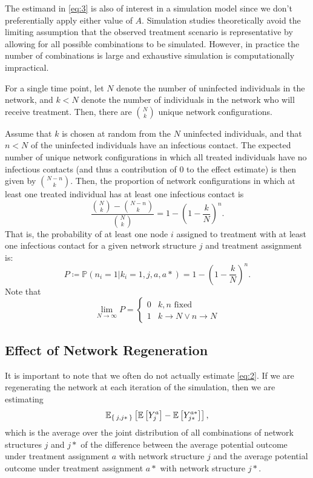 \documentclass{article}
\theoremstyle{definition}
\begin{document}
The estimand in \ref{eq:3} is also of interest in a simulation model since we don't preferentially apply either value of $A$. Simulation studies theoretically avoid the limiting assumption that the observed treatment scenario is representative by allowing for all possible combinations to be simulated. However, in practice the number of combinations is large and exhaustive simulation is computationally impractical.


For a single time point, let $N$ denote the number of uninfected individuals in the network, and $k <N$ denote the number of individuals in the network who will receive treatment. Then, there are $N \choose k$ unique network configurations.

Assume that $k$ is chosen at random from the $N$ uninfected individuals, and that $n<N$ of the uninfected individuals have an infectious contact. The expected number of unique network configurations  in which all treated individuals have no infectious contacts (and thus a contribution of 0 to the effect estimate) is then given by $N-n\choose k$. Then, the proportion of network configurations in which at least one treated individual has at least one infectious contact is 
\begin{equation}\label{eq:4}
    \frac{{N \choose k}-{N-n \choose k}}{{N \choose k}}=1-\left(1-\frac{k}{N}\right)^{n}.
\end{equation}
That is, the probability of at least one node $i$ assigned to treatment with at least one infectious contact for a given network structure $j$ and treatment assignment is:
\begin{equation}\label{eq:5}
    P \coloneqq \mathbb{P}\left(n_{i}=1 \vert k_{i}=1,j,a,a*\right)=1-\left(1-\frac{k}{N}\right)^{n}.
\end{equation}
Note that 
\begin{equation}\label{eq:6}
    \lim_{N \to \infty}P=\begin{cases}0 & k,n \text{ fixed} \\ 1 & k \to N \lor n \to N  \end{cases}
\end{equation}

\subsection{Effect of Network Regeneration}
It is important to note that we often do not actually estimate \ref{eq:2}. If we are regenerating the network at each iteration of the simulation, then we are estimating \begin{equation}\label{eq:8}
    \mathbb{E}_{\Set{j,j*}}\left[\mathbb{E}\left[Y_{j}^{a}\right]-\mathbb{E}\left[Y_{j*}^{a*}\right]\right],
\end{equation} 
which is the average over the joint distribution of all combinations of network structures $j$ and $j*$ of the difference between the average potential outcome under treatment assignment $a$ with network structure $j$ and the average potential outcome under  treatment assignment $a*$ with network structure $j*$.
\end{document}

